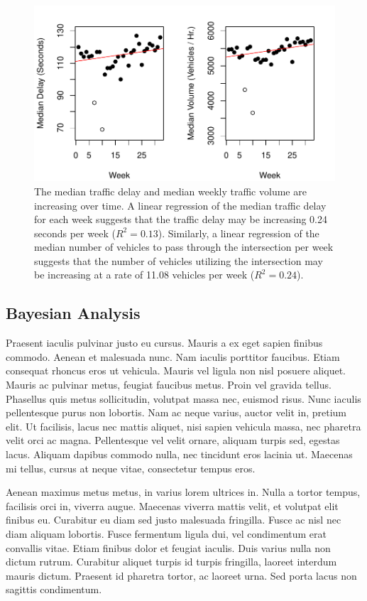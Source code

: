 \documentclass{report}
\begin{document}
\begin{figure}[H]
\centering

\includegraphics{upstat_report-VolumePlot}
\caption{ The median traffic delay and median weekly
traffic volume are increasing over time. A linear regression of the median
traffic delay for each week suggests that the traffic delay may be increasing
0.24 seconds per week
($R^2 = 0.13$). Similarly, a linear
regression of the median number of vehicles to pass through the intersection per
week suggests that the number of vehicles utilizing the intersection may be
increasing at a rate of 11.08 vehicles
per week ($R^2 = 0.24$).}
\label{trends}
\end{figure}

\subsection*{Bayesian Analysis}
Praesent iaculis pulvinar justo eu cursus. Mauris a ex eget sapien finibus commodo. Aenean et malesuada nunc. Nam iaculis porttitor faucibus. Etiam consequat rhoncus eros ut vehicula. Mauris vel ligula non nisl posuere aliquet. Mauris ac pulvinar metus, feugiat faucibus metus. Proin vel gravida tellus. Phasellus quis metus sollicitudin, volutpat massa nec, euismod risus. Nunc iaculis pellentesque purus non lobortis. Nam ac neque varius, auctor velit in, pretium elit. Ut facilisis, lacus nec mattis aliquet, nisi sapien vehicula massa, nec pharetra velit orci ac magna. Pellentesque vel velit ornare, aliquam turpis sed, egestas lacus. Aliquam dapibus commodo nulla, nec tincidunt eros lacinia ut. Maecenas mi tellus, cursus at neque vitae, consectetur tempus eros.

Aenean maximus metus metus, in varius lorem ultrices in. Nulla a tortor tempus, facilisis orci in, viverra augue. Maecenas viverra mattis velit, et volutpat elit finibus eu. Curabitur eu diam sed justo malesuada fringilla. Fusce ac nisl nec diam aliquam lobortis. Fusce fermentum ligula dui, vel condimentum erat convallis vitae. Etiam finibus dolor et feugiat iaculis. Duis varius nulla non dictum rutrum. Curabitur aliquet turpis id turpis fringilla, laoreet interdum mauris dictum. Praesent id pharetra tortor, ac laoreet urna. Sed porta lacus non sagittis condimentum.
\end{document}
